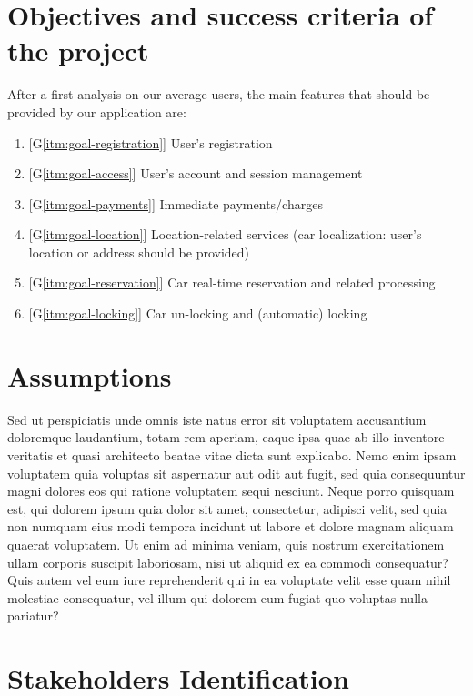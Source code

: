 \section{Objectives and success criteria of the project}
After a first analysis on our average users, the main features that should be provided by our application are:
\begin{enumerate}
	\item{[G\ref{itm:goal-registration}] User's registration}\label{itm:goal-registration}
	\item{[G\ref{itm:goal-access}] User's account and session management}\label{itm:goal-access}
	\item{[G\ref{itm:goal-payments}] Immediate payments/charges}\label{itm:goal-payments}
	\item{[G\ref{itm:goal-location}] Location-related services (car localization: user's location or address should be provided)}\label{itm:goal-location}
	\item{[G\ref{itm:goal-reservation}] Car real-time reservation and related processing}\label{itm:goal-reservation}
	\item{[G\ref{itm:goal-locking}] Car un-locking and (automatic) locking}\label{itm:goal-locking}
\end{enumerate}
\section{Assumptions}
Sed ut perspiciatis unde omnis iste natus error sit voluptatem accusantium doloremque laudantium, totam rem aperiam, 
eaque ipsa quae ab illo inventore veritatis et quasi architecto beatae vitae dicta sunt explicabo. 
Nemo enim ipsam voluptatem quia voluptas sit aspernatur aut odit aut fugit, sed quia consequuntur magni 
dolores eos qui ratione voluptatem sequi nesciunt. Neque porro quisquam est, qui dolorem ipsum quia dolor sit amet, 
consectetur, adipisci velit, sed quia non numquam eius modi tempora incidunt ut labore et dolore magnam aliquam quaerat voluptatem. 
Ut enim ad minima veniam, quis nostrum exercitationem ullam corporis suscipit laboriosam, nisi ut aliquid ex ea commodi consequatur? 
Quis autem vel eum iure reprehenderit qui in ea voluptate velit esse quam nihil molestiae consequatur, 
vel illum qui dolorem eum fugiat quo voluptas nulla pariatur?
\section{Stakeholders Identification}
